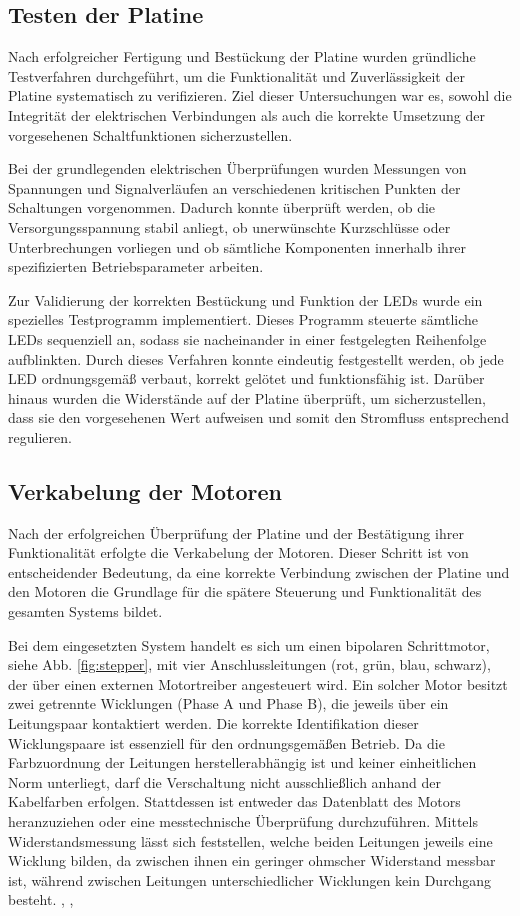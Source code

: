 \subsection{Testen der Platine}

Nach erfolgreicher Fertigung und Bestückung der Platine wurden gründliche Testverfahren durchgeführt, um die Funktionalität und Zuverlässigkeit der Platine systematisch zu verifizieren. Ziel dieser Untersuchungen war es, sowohl die Integrität der elektrischen Verbindungen als auch die korrekte Umsetzung der vorgesehenen Schaltfunktionen sicherzustellen.

Bei der grundlegenden elektrischen Überprüfungen wurden Messungen von Spannungen und Signalverläufen an verschiedenen kritischen Punkten der Schaltungen vorgenommen. Dadurch konnte überprüft werden, ob die Versorgungsspannung stabil anliegt, ob unerwünschte Kurzschlüsse oder Unterbrechungen vorliegen und ob sämtliche Komponenten innerhalb ihrer spezifizierten Betriebsparameter arbeiten.

Zur Validierung der korrekten Bestückung und Funktion der LEDs wurde ein spezielles Testprogramm implementiert. Dieses Programm steuerte sämtliche LEDs sequenziell an, sodass sie nacheinander in einer festgelegten Reihenfolge aufblinkten. Durch dieses Verfahren konnte eindeutig festgestellt werden, ob jede LED ordnungsgemäß verbaut, korrekt gelötet und funktionsfähig ist. Darüber hinaus wurden die Widerstände auf der Platine überprüft, um sicherzustellen, dass sie den vorgesehenen Wert aufweisen und somit den Stromfluss entsprechend regulieren.

\subsection{Verkabelung der Motoren}
Nach der erfolgreichen Überprüfung der Platine und der Bestätigung ihrer Funktionalität erfolgte die Verkabelung der Motoren. Dieser Schritt ist von entscheidender Bedeutung, da eine korrekte Verbindung zwischen der Platine und den Motoren die Grundlage für die spätere Steuerung und Funktionalität des gesamten Systems bildet.

Bei dem eingesetzten System handelt es sich um einen bipolaren Schrittmotor, siehe Abb. \ref{fig:stepper}, mit vier Anschlussleitungen (rot, grün, blau, schwarz), der über einen externen Motortreiber angesteuert wird. Ein solcher Motor besitzt zwei getrennte Wicklungen (Phase A und Phase B), die jeweils über ein Leitungspaar kontaktiert werden. Die korrekte Identifikation dieser Wicklungspaare ist essenziell für den ordnungsgemäßen Betrieb. Da die Farbzuordnung der Leitungen herstellerabhängig ist und keiner einheitlichen Norm unterliegt, darf die Verschaltung nicht ausschließlich anhand der Kabelfarben erfolgen. Stattdessen ist entweder das Datenblatt des Motors heranzuziehen oder eine messtechnische Überprüfung durchzuführen. Mittels Widerstandsmessung lässt sich feststellen, welche beiden Leitungen jeweils eine Wicklung bilden, da zwischen ihnen ein geringer ohmscher Widerstand messbar ist, während zwischen Leitungen unterschiedlicher Wicklungen kein Durchgang besteht.
\cite{KEM2021}, \cite{Nanotec2024}, \cite{RestonCondit2004}

